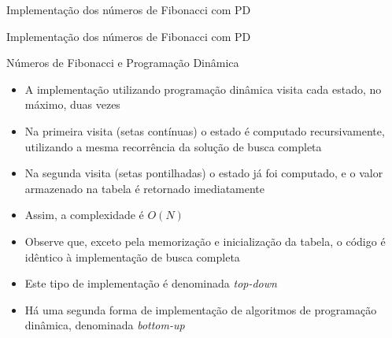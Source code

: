 \begin{frame}[fragile]{Implementação dos números de Fibonacci com PD}
\end{frame}

\begin{frame}[fragile]{Implementação dos números de Fibonacci com PD}
\end{frame}



\begin{frame}[fragile]{Números de Fibonacci e Programação Dinâmica}

    \begin{itemize}
        \item A implementação utilizando programação dinâmica visita cada estado, no máximo,
            duas vezes
        \pause

        \item Na primeira visita (setas contínuas) o estado é computado recursivamente, utilizando
            a mesma recorrência da solução de busca completa
        \pause

        \item Na segunda visita (setas pontilhadas) o estado já foi computado, e o valor armazenado
            na tabela é retornado imediatamente
        \pause

        \item Assim, a complexidade é $O(N)$
        \pause

        \item Observe que, exceto pela memorização e inicialização da tabela, o código é idêntico
            à implementação de busca completa
        \pause

        \item Este tipo de implementação é denominada \textit{top-down}
        \pause

        \item Há uma segunda forma de implementação de algoritmos de programação dinâmica,
            denominada \textit{bottom-up}
    \end{itemize}

\end{frame}
